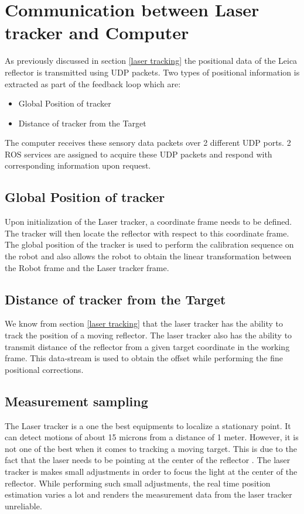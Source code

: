 \documentclass{LTHthesis}
\begin{document}
    \section{Communication between Laser tracker and Computer}
    As previously discussed in section \ref{laser tracking} the positional data of the Leica reflector is transmitted using UDP packets. Two types of positional information is extracted as part of the feedback loop which are: \begin{itemize}
        \item Global Position of tracker 
        \item Distance of tracker from the Target 
    \end{itemize}
    
    The computer receives these sensory data packets over 2 different UDP ports. 2 ROS services are assigned to acquire these UDP packets and respond with corresponding information upon request. 
        \subsection{Global Position of tracker}
            Upon initialization of the Laser tracker, a coordinate frame needs to be defined. The tracker will then locate the reflector  with respect to this coordinate frame. The global position of the tracker is used to perform the calibration sequence on the robot and also allows the robot to obtain the linear transformation between the Robot frame and the Laser tracker frame.
        \subsection{Distance of tracker from the Target}
            We know from section \ref{laser tracking} that the laser tracker has the ability to track the position of a moving reflector. The laser tracker also has the ability to transmit distance of the reflector from a given target coordinate in the working frame. This data-stream is used to obtain the offset while performing the fine positional corrections.
        \subsection{Measurement sampling}
            The Laser tracker is a one the best equipments to localize a stationary point. It can detect motions of about 15 microns from a distance of 1 meter. However, it is not one of the best when it comes to tracking a moving target. This is due to the fact that the laser needs to be pointing at the center of the reflector . The laser tracker is makes small adjustments in order to focus the light at the center of the reflector. While performing such small adjustments, the real time position estimation varies a lot and renders the measurement data from the laser tracker unreliable. 
\end{document}
